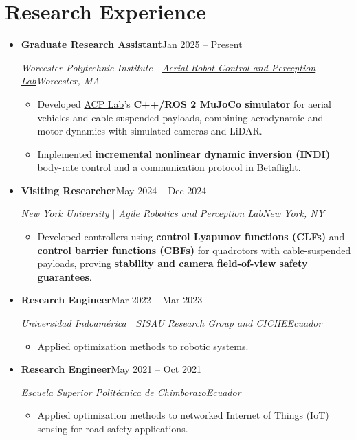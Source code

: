 \documentclass[letterpaper,11pt]{article}
\newcommand{\resumeItem}[1]{
  \item {\small #1\par}\vspace{-2pt}
}
\newcommand{\resumeSubheading}[4]{
  \vspace{-2pt}\item
    \textbf{#1}\enspace\textbar\enspace #2\\
    {\small\textit{#3\enspace\textbar\enspace #4}\par}\vspace{-5pt}
}
\newcommand{\resumeSubHeadingListStart}{\begin{itemize}[leftmargin=0.15in, label={}, topsep=3pt]}
\newcommand{\resumeSubHeadingListEnd}{\end{itemize}}
\newcommand{\resumeItemListStart}{\begin{itemize}}
\newcommand{\resumeItemListEnd}{\end{itemize}\vspace{-5pt}}
\begin{document}
\section{Research Experience}
\resumeSubHeadingListStart
\resumeSubheading{Graduate Research Assistant}{Jan 2025 -- Present}
{Worcester Polytechnic Institute $|$ \href{https://acp-lab.github.io/acplab-web/}{Aerial-Robot Control and Perception Lab}}{Worcester, MA}
\resumeItemListStart
\resumeItem{Developed \href{https://acp-lab.github.io/acplab-web/}{ACP Lab}'s \textbf{C++/ROS 2 MuJoCo simulator} for aerial vehicles and cable-suspended payloads, combining aerodynamic and motor dynamics with simulated cameras and LiDAR.}
\resumeItem{Implemented \textbf{incremental nonlinear dynamic inversion (INDI)} body-rate control and a communication protocol in Betaflight.}
\resumeItemListEnd
\resumeSubheading{Visiting Researcher}{May 2024 -- Dec 2024}
{New York University $|$ \href{https://arplaboratory.github.io/}{Agile Robotics and Perception Lab}}{New York, NY}
\resumeItemListStart
\resumeItem{Developed controllers using \textbf{control Lyapunov functions (CLFs)} and \textbf{control barrier functions (CBFs)} for quadrotors with cable-suspended payloads, proving \textbf{stability and camera field-of-view safety guarantees}.}
\resumeItemListEnd
\resumeSubheading{Research Engineer}{Mar 2022 -- Mar 2023}
{Universidad Indoam\'erica $|$ SISAU Research Group and CICHE}{Ecuador}
\resumeItemListStart
\resumeItem{Applied optimization methods to robotic systems.}
\resumeItemListEnd
\resumeSubheading{Research Engineer}{May 2021 -- Oct 2021}
{Escuela Superior Polit\'ecnica de Chimborazo}{Ecuador}
\resumeItemListStart
\resumeItem{Applied optimization methods to networked Internet of Things (IoT) sensing for road-safety applications.}
\resumeItemListEnd
\resumeSubHeadingListEnd
\end{document}
